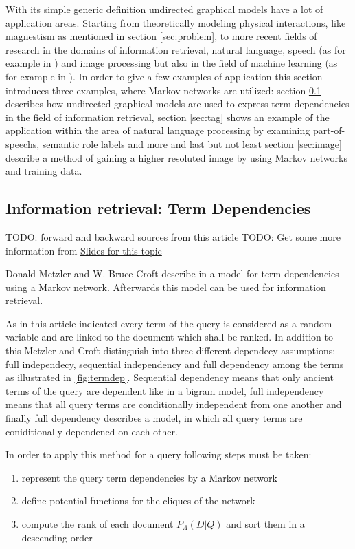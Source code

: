 With its simple generic definition undirected graphical models have a lot of application areas. Starting from theoretically modeling physical interactions, like magnestism as mentioned in section \ref{sec:problem}, to more recent fields of research in the domains of information retrieval, natural language, speech (as for example in \cite{}) and image processing but also in the field of machine learning (as for example in \cite{}). In order to give a few examples of application this section introduces three examples, where Markov networks are utilized: section \ref{sec:term} describes how undirected graphical models are used to express term dependencies in the field of information retrieval, section \ref{sec:tag} shows an example of the application within the area of natural language processing by examining part-of-speechs, semantic role labels and more and last but not least section \ref{sec:image} describe a method of gaining a higher resoluted image by using Markov networks and training data.

\subsection{Information retrieval: Term Dependencies}
\label{sec:term}

TODO: forward and backward sources from this article \cite{metzler2005markov}
TODO: Get some more information from \href{http:\\www.slideplayer.com/slide/6012545}{Slides for this topic}

Donald Metzler and W. Bruce Croft describe in \cite{metzler2005markov} a model for term dependencies using a Markov network. Afterwards this model can be used for information retrieval.

As in this article indicated every term of the query is considered as a random variable and are linked to the document which shall be ranked. In addition to this Metzler and Croft distinguish into three different dependecy assumptions: full independecy, sequential independency and full dependency among the terms as illustrated in \ref{fig:termdep}. Sequential dependency means that only ancient terms of the query are dependent like in a bigram model, full independency means that all query terms are conditionally independent from one another and finally full dependency describes a model, in which all query terms are coniditionally dependened on each other.

In order to apply this method for a query following steps must be taken:
\begin{enumerate}
\item represent the query term dependencies by a Markov network
\item define potential functions for the cliques of the network
\item compute the rank of each document $P_\Lambda (D|Q)$ and sort them in a descending order
\end{enumerate}

